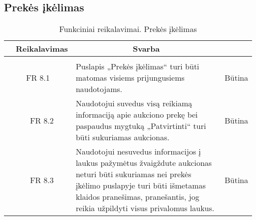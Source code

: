 \documentclass{VUMIFPSkursinis}
\begin{document}
\subsection{Prekės įkėlimas}
\begin{table}[H]
	\caption{Funkciniai reikalavimai. Prekės įkėlimas}
	\begin{tabular}{|p{1cm}|p{1cm}|p{}|p{}|}
		\hline 
		\rowcolor{gray!50}
		\multicolumn{2}{|c|}{{\bfseries Kodas}}&
		\multicolumn{1}{c|}{{\bfseries Reikalavimas}}&
		\multicolumn{1}{c|}{{\bfseries Svarba}}\\
		\hline
		\rowcolor{lightgray}
		\multicolumn{4}{|c|}{Prekės įkėlimas}\\		
		
		\hline
		\multicolumn{2}{|c|}{FR 8.1}&
		{Puslapis „Prekės įkėlimas“ turi būti matomas visiems prijungusiems naudotojams.
		}&		
		\multicolumn{1}{c|}{Būtina}\\
		\hline
		\multicolumn{1}{|c}{}&
		\multicolumn{1}{c|}{FR 8.2}&
		{Naudotojui suvedus visą reikiamą informaciją apie aukciono prekę bei paspaudus mygtuką „Patvirtinti“ turi būti sukuriamas aukcionas.
		}&		
		\multicolumn{1}{c|}{Būtina}\\
		\hline	
		\multicolumn{1}{|c}{}&
		\multicolumn{1}{c|}{FR 8.3}&
		{Naudotojui nesuvedus informacijos į laukus pažymėtus žvaigždute aukcionas neturi būti sukuriamas nei prekės įkėlimo puslapyje turi būti išmetamas klaidos pranešimas, pranešantis, jog reikia užpildyti visus privalomus laukus.
		}&
		\multicolumn{1}{c|}{Būtina}\\									
		\hline
	\end{tabular}		
\end{table}
\end{document}
